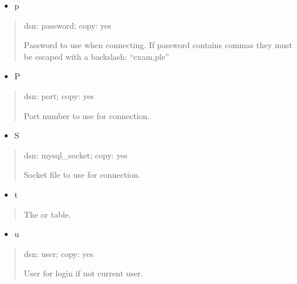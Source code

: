 \documentclass[letterpaper,10pt,english]{sphinxmanual}
\begin{document}
\begin{itemize}
\item {} 
\sphinxAtStartPar
p

\end{itemize}
\begin{quote}

\sphinxAtStartPar
dsn: password; copy: yes

\sphinxAtStartPar
Password to use when connecting.
If password contains commas they must be escaped with a backslash: “exam,ple”
\end{quote}
\begin{itemize}
\item {} 
\sphinxAtStartPar
P

\end{itemize}
\begin{quote}

\sphinxAtStartPar
dsn: port; copy: yes

\sphinxAtStartPar
Port number to use for connection.
\end{quote}
\begin{itemize}
\item {} 
\sphinxAtStartPar
S

\end{itemize}
\begin{quote}

\sphinxAtStartPar
dsn: mysql\_socket; copy: yes

\sphinxAtStartPar
Socket file to use for connection.
\end{quote}
\begin{itemize}
\item {} 
\sphinxAtStartPar
t

\end{itemize}
\begin{quote}

\sphinxAtStartPar
The {\hyperref[\detokenize{mariadb-query-digest:cmdoption-mariadb-query-digest-review}]{}} or {\hyperref[\detokenize{mariadb-query-digest:cmdoption-mariadb-query-digest-history}]{}} table.
\end{quote}
\begin{itemize}
\item {} 
\sphinxAtStartPar
u

\end{itemize}
\begin{quote}

\sphinxAtStartPar
dsn: user; copy: yes

\sphinxAtStartPar
User for login if not current user.
\end{quote}
\end{document}
